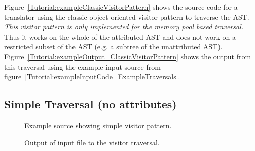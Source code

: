 Figure~\ref{Tutorial:exampleClassicVisitorPattern} shows the source code 
for a translator using the classic object-oriented visitor pattern 
to traverse the AST.  {\em This visitor pattern is only implemented
for the memory pool based traversal.}  Thus it works on the whole
of the attributed AST and does not work on a restricted subset of 
the AST (e.g. a subtree of the unattributed AST).
Figure~\ref{Tutorial:exampleOutput_ClassicVisitorPattern} shows the 
output from this traversal using the example input source from 
figure~\ref{Tutorial:exampleInputCode_ExampleTraversals}.



\subsection{Simple Traversal (no attributes)}
\label{ASTSimpleProcessing_traversal}

\begin{figure}[!h]
{\indent
{\mySmallFontSize

\begin{latexonly}
   
\end{latexonly}

\begin{htmlonly}
   
\end{htmlonly}

}
}
\caption{Example source showing simple visitor pattern.}
\label{Tutorial:exampleVisitorTraversal}
\end{figure}


\begin{figure}[!h]
{\indent
{\mySmallFontSize


\begin{latexonly}
   
\end{latexonly}

\begin{htmlonly}
   
\end{htmlonly}

}
}
\caption{Output of input file to the visitor traversal.}
\label{Tutorial:exampleOutput_VisitorTraversal}
\end{figure}

